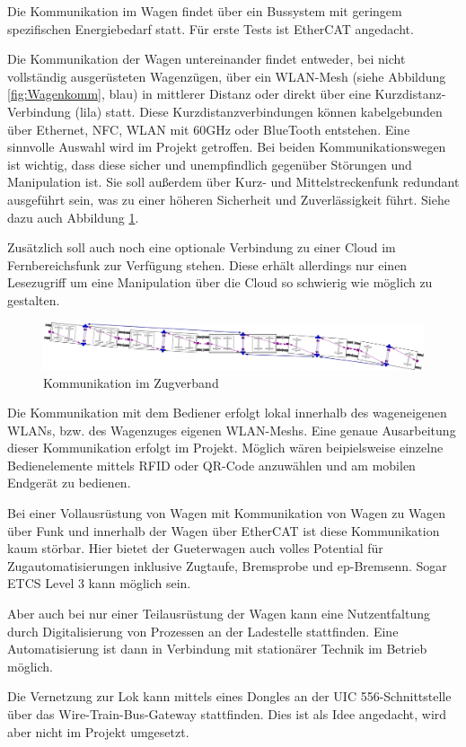 Die Kommunikation im Wagen findet über ein Bussystem mit geringem spezifischen Energiebedarf statt. Für erste Tests ist EtherCAT angedacht.\par
Die Kommunikation der Wagen untereinander findet entweder, bei nicht vollständig ausgerüsteten Wagenzügen, über ein WLAN-Mesh (siehe Abbildung \ref{fig:Wagenkomm}, blau) in mittlerer Distanz oder direkt über eine Kurzdistanz-Verbindung (lila) statt. Diese Kurzdistanzverbindungen können kabelgebunden über Ethernet, NFC, WLAN mit 60GHz oder BlueTooth entstehen. Eine sinnvolle Auswahl wird im Projekt getroffen. Bei beiden Kommunikationswegen ist wichtig, dass diese sicher und unempfindlich gegenüber Störungen und Manipulation ist. Sie soll außerdem über Kurz- und Mittelstreckenfunk redundant ausgeführt sein, was zu einer  höheren Sicherheit und Zuverlässigkeit führt. Siehe dazu auch Abbildung \ref{fig:Zugkomm}. \par
Zusätzlich soll auch noch eine optionale Verbindung zu einer Cloud im Fernbereichsfunk zur Verfügung stehen. Diese erhält allerdings nur einen Lesezugriff um eine Manipulation über die Cloud so schwierig wie möglich zu gestalten.\par
\begin{figure}[hbt]
    \centering
    \includegraphics[width=\textwidth]{Bilder/zug_draufsicht_bogen.png}
    \caption{Kommunikation im Zugverband\cite{autonBetrieb}}
    \label{fig:Zugkomm}
\end{figure}
Die Kommunikation mit dem Bediener erfolgt lokal innerhalb des wageneigenen WLANs, bzw. des \gls{Wagenzug}es eigenen WLAN-Meshs. Eine genaue Ausarbeitung dieser Kommunikation erfolgt im Projekt. Möglich wären beipielsweise einzelne Bedienelemente mittels RFID oder QR-Code anzuwählen und am mobilen Endgerät zu bedienen.\par
Bei einer Vollausrüstung von Wagen mit Kommunikation von Wagen zu Wagen über Funk und innerhalb der Wagen über EtherCAT ist diese Kommunikation kaum störbar. Hier bietet der \gls{Gueterwagen} auch volles Potential für Zugautomatisierungen inklusive Zugtaufe, \gls{Bremsprobe} und \gls{ep-Bremsen}n. Sogar ETCS Level 3 kann möglich sein.\par
Aber auch bei nur einer Teilausrüstung der Wagen kann eine Nutzentfaltung durch Digitalisierung von Prozessen an der Ladestelle stattfinden. Eine Automatisierung ist dann in Verbindung mit stationärer Technik im Betrieb möglich.\par
Die Vernetzung zur Lok kann mittels eines Dongles an der UIC 556-Schnittstelle über das Wire-Train-Bus-Gateway stattfinden. Dies ist als Idee angedacht, wird aber nicht im Projekt umgesetzt.\par

